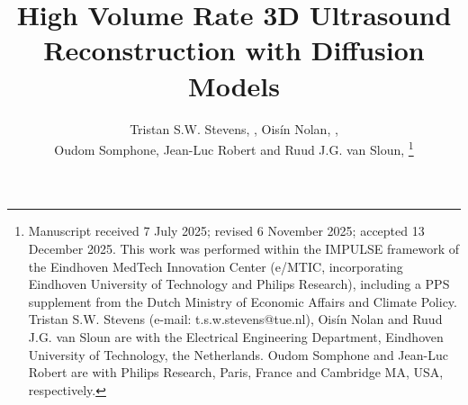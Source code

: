 \documentclass[journal,twoside,web,dvipsnames]{ieeecolor}          %
\begin{document}
\title{High Volume Rate 3D Ultrasound Reconstruction with Diffusion Models}
\author{Tristan S.W. Stevens, , Oisín Nolan, , \\ Oudom Somphone, Jean-Luc Robert and Ruud J.G. van Sloun,  \vspace{-1cm}
\thanks{
Manuscript received 7 July 2025; revised 6 November 2025; accepted 13 December 2025. This work was performed within the IMPULSE framework of the Eindhoven MedTech Innovation Center (e/MTIC, incorporating Eindhoven University of Technology and Philips Research), including a PPS supplement from the Dutch Ministry of Economic Affairs and Climate Policy.\\
\indent Tristan S.W. Stevens (e-mail: t.s.w.stevens@tue.nl), Oisín Nolan and Ruud J.G. van Sloun are with the Electrical Engineering Department,
Eindhoven University of Technology, the Netherlands. Oudom Somphone and Jean-Luc Robert are with Philips Research, Paris, France and Cambridge MA, USA, respectively.}}


\end{document}
